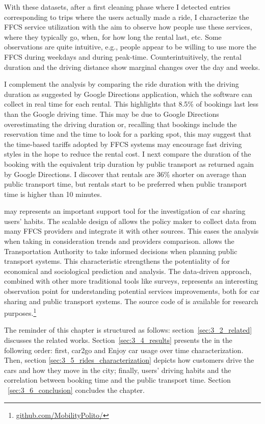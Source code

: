 With these datasets, after a first cleaning phase where I detected entries corresponding to trips where the users actually made a ride, I characterize the FFCS service utilization with the aim to observe how people use these services, where they typically go, when, for how long the rental last, etc. Some observations are quite intuitive, e.g., people appear to be willing to use more the FFCS during weekdays and during peak-time. Counterintuitively, the rental duration and the driving distance show marginal changes over the day and weeks.

I complement the analysis by comparing the ride duration with the driving duration as suggested by Google Directions application, which the software can collect in real time for each rental. This highlights that 8.5\% of bookings last less than the Google driving time. 
This may be due to Google Directions overestimating the driving duration or, recalling that bookings  include the reservation time and the time to look for a parking spot, this may suggest that the time-based tariffs adopted by FFCS systems may encourage fast driving styles in the hope to reduce the rental cost.
I next compare the duration of the booking with the equivalent trip duration by public transport as returned again by Google Directions. I discover that rentals are 36\% shorter on average than public transport time, but  rentals start to be preferred when public transport time is higher than 10 minutes.

\tool may represents an important support tool for the investigation of car sharing users' habits. The scalable design of \tool allows the policy maker to collect data from many FFCS providers  and integrate it with other sources. This eases the analysis when taking in consideration trends and providers comparison. \tool allows the Transportation Authority to take informed decisions when planning public transport systems. This characteristic strengthens the potentiality of \tool for economical and sociological prediction and analysis. The data-driven approach, combined with other more traditional tools like surveys, represents an interesting observation point for understanding potential services improvements, both for car sharing and public transport systems. The source code of \tool  is available for research purposes.\footnote{\url{github.com/MobilityPolito/}}

The reminder of this chapter is structured as follows: section~\ref{sec:3_2_related} discusses the related works. Section~\ref{sec:3_4_results} presents the in the following order: first, car2go and Enjoy car usage over time characterization. Then, section \ref{sec:3_5_rides_characterization} depicts how customers drive the cars and how they move in the city; finally, users' driving habits and the correlation between booking time and the public transport time. Section ~\ref{sec:3_6_conclusion} concludes the chapter.

